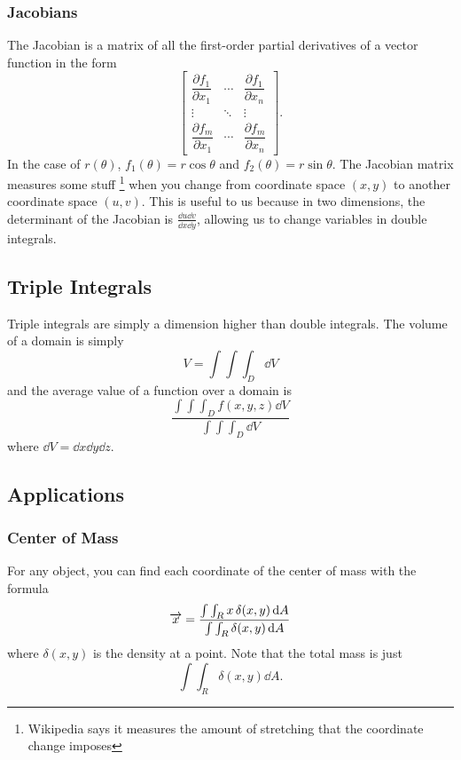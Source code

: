 \documentclass[12pt]{article}
\theoremstyle{plain} %
\theoremstyle{definition}
\theoremstyle{definition}
\theoremstyle{definition}
\theoremstyle{remark}
\newcommand*{\vv}[1]{\overrightarrow{\mkern0mu#1}}
\begin{document}
\subsubsection{Jacobians}
The Jacobian is a matrix of all the first-order partial derivatives of a vector function in the form
\[ \begin{bmatrix}
    \dfrac{\partial f_1}{\partial x_1} & \cdots & \dfrac{\partial f_1}{\partial x_n}\\
    \vdots                             & \ddots & \vdots\\
    \dfrac{\partial f_m}{\partial x_1} & \cdots & \dfrac{\partial f_m}{\partial x_n}
\end{bmatrix}. \]
In the case of $r(\theta)$, $f_1(\theta) = r\cos{\theta}$ and $f_2(\theta) = r\sin{\theta}$.
The Jacobian matrix measures some stuff \footnote{Wikipedia says it measures the amount of stretching that the coordinate change imposes} when you change from coordinate space $(x,y)$ to another coordinate space $(u,v)$. This is useful to us because in two dimensions, the determinant of the Jacobian is $\frac{\dd{u}\dd{v}}{\dd{x}\dd{y}}$, allowing us to change variables in double integrals.

\subsection{Triple Integrals}
Triple integrals are simply a dimension higher than double integrals. The volume of a domain is simply
\[ V = \int\int\int_D \dd{V} \]
and the average value of a function over a domain is
\[ \frac{\int\int\int_D f(x,y,z) \dd{V}}{\int\int\int_D \dd{V}} \]
where $\dd{V} = \dd{x}\dd{y}\dd{z}$.

\subsection{Applications}
\subsubsection{Center of Mass}
For any object, you can find each coordinate of the center of mass with the formula
\[ \vv{x} = \frac{\int\int_R x \, \delta(x,y) \dd{A}}{\int\int_R \delta(x,y) \dd{A}} \]
where $\delta(x,y)$ is the density at a point.
Note that the total mass is just \[\int\int_R \delta(x,y) \dd{A}.\]
\end{document}
